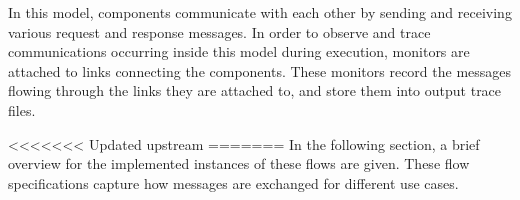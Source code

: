 \documentclass[conference]{IEEEtran}
\begin{document}
In this model, components communicate with each other by sending and receiving various request and response messages.  In order to observe and trace communications occurring inside this model during execution, monitors are attached to links connecting the components. These monitors record the messages flowing through the links they are attached to, and store them into output trace files.

<<<<<<< Updated upstream
=======
In the following section, a brief overview for the implemented instances of these flows are given. These flow specifications capture how messages are exchanged for different use cases.%
\end{document}
